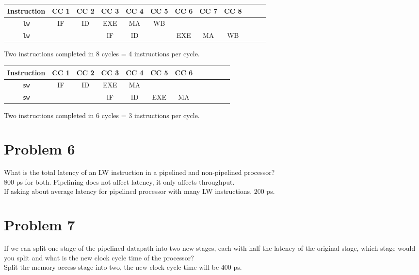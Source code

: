 \documentclass[10pt,letterpaper]{article}
\begin{document}
\begin{enumerate}[label=\Alph*)]
\begin{center}
\begin{tabular} { |c|c|c|c|c|c|c|c|c|c|c|c| }
\hline
Instruction & CC 1 & CC 2 & CC 3 & CC 4 & CC 5 & CC 6 & CC 7 & CC 8 \\
\hline
\texttt{lw} & IF & ID & EXE & MA & WB & & & \\
\hline
\texttt{lw} & & & IF & ID & & EXE & MA & WB \\
\hline
\end{tabular}
\end{center}
Two instructions completed in 8 cycles = 4 instructions per cycle.
\begin{center}
\begin{tabular} { |c|c|c|c|c|c|c|c|c|c|c|c| }
\hline
Instruction & CC 1 & CC 2 & CC 3 & CC 4 & CC 5 & CC 6 \\
\hline
\texttt{sw} & IF & ID & EXE & MA & & \\
\hline
\texttt{sw} & & & IF & ID & EXE & MA \\
\hline
\end{tabular}
\end{center}
Two instructions completed in 6 cycles = 3 instructions per cycle.
\end{enumerate}

\pagebreak


\section{Problem 6}
What is the total latency of an LW instruction in a pipelined and non-pipelined processor?\\
800 ps for both. Pipelining does not affect latency, it only affects throughput.\\
If asking about average latency for pipelined processor with many LW instructions, 200 ps.


\section{Problem 7}
If we can split one stage of the pipelined datapath into two new stages, each with half the latency of the original stage, which stage would you split and what is the new clock cycle time of the processor?\\
Split the memory access stage into two, the new clock cycle time will be 400 ps.

\end{document}
